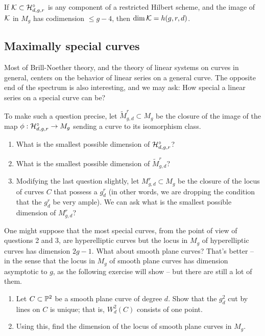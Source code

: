\begin{conjecture}
If $\cK \subset \cH^\circ_{d,g,r}$ is any component of a restricted Hilbert scheme, and the image of $\cK$ in $M_g$ has codimension $\leq g-4$, then $\dim \cK = h(g,r,d)$.
\end{conjecture}

\subsection{Maximally special  curves} Most of Brill-Noether theory, and the theory of linear systems on curves in general, centers on the behavior of linear series on a general curve. The opposite end of the spectrum is also interesting, and we may ask: How special  a linear series on a special curve can be?

To make such a question precise, let $\tilde M^r_{g,d} \subset M_g$ be the closure of the image of the map $\phi : \cH^\circ_{d,g,r}\to M_g$ sending a curve to its isomorphism class. 
\begin{enumerate}
\item What is the smallest possible dimension of $\cH^\circ_{d,g,r}$? 
\item What is the smallest possible dimension of $\tilde M^r_{g,d}$?
\item Modifying the last question slightly, let $M^r_{g,d} \subset M_g$ be the closure of the locus of curves $C$ that possess a $g^r_d$ (in other words, we are dropping the condition that the $g^r_d$ be very ample). We can ask what is the smallest possible dimension of $M^r_{g,d}$?
\end{enumerate}

One might suppose that the most special curves, from the point of view of questions 2 and 3, are hyperelliptic curves but the locus in $M_g$ of hyperelliptic curves has dimension $2g-1$. What about smooth plane curves? That's better -- in the sense that the locus in $M_g$ of smooth plane curves has dimension asymptotic to $g$, as the following exercise will show -- but there are still a lot of them.

\begin{exercise}
\begin{enumerate}
\item Let $C \subset \PP^2$ be a smooth plane curve of degree $d$. Show that the $g^2_d$ cut by lines on $C$ is unique; that is, $W^2_d(C)$ consists of one point.
\item Using this, find the dimension of the locus of smooth plane curves in $M_g$.
\end{enumerate}
\end{exercise}

